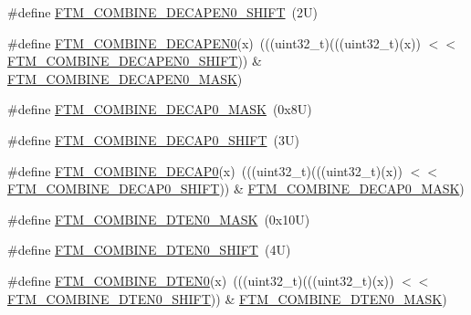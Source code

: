 \begin{DoxyCompactItemize}
\item 
\#define \mbox{\hyperlink{group___f_t_m___register___masks_ga5e5b2330d62feae3345f42df20e7f169}{F\+T\+M\+\_\+\+C\+O\+M\+B\+I\+N\+E\+\_\+\+D\+E\+C\+A\+P\+E\+N0\+\_\+\+S\+H\+I\+FT}}~(2\+U)
\item 
\#define \mbox{\hyperlink{group___f_t_m___register___masks_ga65b8ad7bee151a6ac741da7e9b569cfb}{F\+T\+M\+\_\+\+C\+O\+M\+B\+I\+N\+E\+\_\+\+D\+E\+C\+A\+P\+E\+N0}}(x)~(((uint32\+\_\+t)(((uint32\+\_\+t)(x)) $<$$<$ \mbox{\hyperlink{group___f_t_m___register___masks_ga5e5b2330d62feae3345f42df20e7f169}{F\+T\+M\+\_\+\+C\+O\+M\+B\+I\+N\+E\+\_\+\+D\+E\+C\+A\+P\+E\+N0\+\_\+\+S\+H\+I\+FT}})) \& \mbox{\hyperlink{group___f_t_m___register___masks_ga77c4a4aae8406f791ebfbc82ba85b584}{F\+T\+M\+\_\+\+C\+O\+M\+B\+I\+N\+E\+\_\+\+D\+E\+C\+A\+P\+E\+N0\+\_\+\+M\+A\+SK}})
\item 
\#define \mbox{\hyperlink{group___f_t_m___register___masks_ga9d79e8bd8bf1855adbe370ae1499d48d}{F\+T\+M\+\_\+\+C\+O\+M\+B\+I\+N\+E\+\_\+\+D\+E\+C\+A\+P0\+\_\+\+M\+A\+SK}}~(0x8\+U)
\item 
\#define \mbox{\hyperlink{group___f_t_m___register___masks_ga4bfcf4d8cf838ad852c50cf589fd3d95}{F\+T\+M\+\_\+\+C\+O\+M\+B\+I\+N\+E\+\_\+\+D\+E\+C\+A\+P0\+\_\+\+S\+H\+I\+FT}}~(3\+U)
\item 
\#define \mbox{\hyperlink{group___f_t_m___register___masks_ga0e2341e3003ac500312d30d634e14859}{F\+T\+M\+\_\+\+C\+O\+M\+B\+I\+N\+E\+\_\+\+D\+E\+C\+A\+P0}}(x)~(((uint32\+\_\+t)(((uint32\+\_\+t)(x)) $<$$<$ \mbox{\hyperlink{group___f_t_m___register___masks_ga4bfcf4d8cf838ad852c50cf589fd3d95}{F\+T\+M\+\_\+\+C\+O\+M\+B\+I\+N\+E\+\_\+\+D\+E\+C\+A\+P0\+\_\+\+S\+H\+I\+FT}})) \& \mbox{\hyperlink{group___f_t_m___register___masks_ga9d79e8bd8bf1855adbe370ae1499d48d}{F\+T\+M\+\_\+\+C\+O\+M\+B\+I\+N\+E\+\_\+\+D\+E\+C\+A\+P0\+\_\+\+M\+A\+SK}})
\item 
\#define \mbox{\hyperlink{group___f_t_m___register___masks_ga9722d2bdaba256dd90324aa6b199ee4f}{F\+T\+M\+\_\+\+C\+O\+M\+B\+I\+N\+E\+\_\+\+D\+T\+E\+N0\+\_\+\+M\+A\+SK}}~(0x10\+U)
\item 
\#define \mbox{\hyperlink{group___f_t_m___register___masks_gaab1a185d98eb899fea411daf0386858a}{F\+T\+M\+\_\+\+C\+O\+M\+B\+I\+N\+E\+\_\+\+D\+T\+E\+N0\+\_\+\+S\+H\+I\+FT}}~(4\+U)
\item 
\#define \mbox{\hyperlink{group___f_t_m___register___masks_ga795235a6e1d018480ae22da95749dbf3}{F\+T\+M\+\_\+\+C\+O\+M\+B\+I\+N\+E\+\_\+\+D\+T\+E\+N0}}(x)~(((uint32\+\_\+t)(((uint32\+\_\+t)(x)) $<$$<$ \mbox{\hyperlink{group___f_t_m___register___masks_gaab1a185d98eb899fea411daf0386858a}{F\+T\+M\+\_\+\+C\+O\+M\+B\+I\+N\+E\+\_\+\+D\+T\+E\+N0\+\_\+\+S\+H\+I\+FT}})) \& \mbox{\hyperlink{group___f_t_m___register___masks_ga9722d2bdaba256dd90324aa6b199ee4f}{F\+T\+M\+\_\+\+C\+O\+M\+B\+I\+N\+E\+\_\+\+D\+T\+E\+N0\+\_\+\+M\+A\+SK}})
$$
\end{DoxyCompactItemize}
